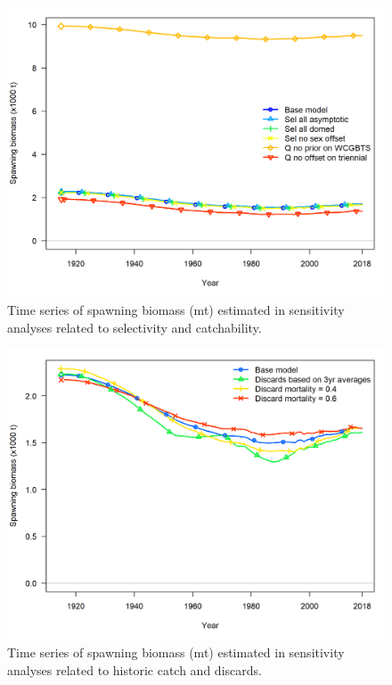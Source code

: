 \documentclass[12pt,]{article}
\begin{document}
\begin{figure}[H]
\begin{centering}
\includegraphics{Figures/sens.sel_and_Q_compare1_spawnbio.png}
\caption{Time series of spawning biomass (mt) estimated in sensitivity analyses related to selectivity and catchability.}\label{fig:Sensitivity_sel_and_Q}
\end{centering}
\end{figure}

\newpage

\begin{figure}
\centering
\includegraphics{Figures/sens.catch_compare1_spawnbio.png}
\caption{Time series of spawning biomass (mt) estimated in sensitivity
analyses related to historic catch and discards.
\label{fig:Sensitivity_catch}}
\end{figure}
\end{document}
